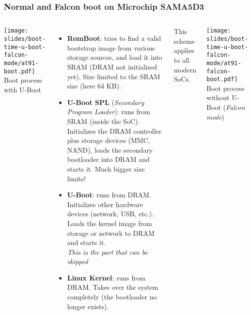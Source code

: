\begin{frame}
  \frametitle{Normal and Falcon boot on Microchip SAMA5D3}
  \begin{columns}
    \begin{center}
    \texttt{[image: slides/boot-time-u-boot-falcon-mode/at91-boot.pdf]}\\
    \vspace{0.5cm}
    \tiny Boot process with U-Boot
    \end{center}
    \footnotesize
    \begin{itemize}
    \item {\bf RomBoot}: tries to find a valid bootstrap image from
      various storage sources, and load it into SRAM (DRAM not
      initialized yet). Size limited to the SRAM size (here 64 KB).
    \item {\bf U-Boot SPL} ({\em Secondary Program Loader}):
       runs from SRAM (inside the SoC). Initializes the DRAM
       controller plus storage devices (MMC, NAND), loads the
       secondary bootloader into DRAM and starts it. Much bigger
       size limits!
    \item {\bf U-Boot}: runs from DRAM. Initializes other hardware
      devices (network, USB, etc.). Loads the kernel image from
      storage or network to DRAM and starts it.\\
      {\em This is the part that can be skipped}
    \item {\bf Linux Kernel}: runs from DRAM. Takes over the system
      completely (the bootloader no longer exists).
    \end{itemize}
    This scheme applies to all modern SoCs.
    \vspace{1cm}
    \begin{center}
    \texttt{[image: slides/boot-time-u-boot-falcon-mode/at91-falcon-boot.pdf]}\\
    \vspace{0.5cm}
    \tiny Boot process without U-Boot ({\em Falcon mode})
    \end{center}
  \end{columns}
\end{frame}

